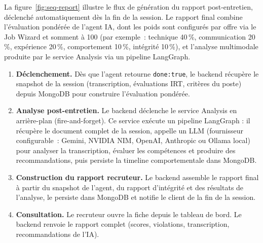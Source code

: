 La figure~\ref{fig:seq-report} illustre le flux de génération du rapport post-entretien,
déclenché automatiquement dès la fin de la session. Le rapport final combine l'évaluation
pondérée de l'agent IA, dont les poids sont configurés par offre via le Job Wizard et
somment à 100 (par exemple~: technique 40\,\%, communication 20\,\%, expérience 20\,\%,
comportement 10\,\%, intégrité 10\,\%), et l'analyse multimodale produite par le service
Analysis via un pipeline LangGraph.

\begin{sloppypar}
\begin{enumerate}
  \item \textbf{Déclenchement.} Dès que l'agent retourne \texttt{done:true}, le backend
        récupère le snapshot de la session (transcription, évaluations IRT, critères du
        poste) depuis MongoDB pour construire l'évaluation pondérée.

  \item \textbf{Analyse post-entretien.} Le backend déclenche le service Analysis en
        arrière-plan (fire-and-forget). Ce service exécute un pipeline LangGraph : il
        récupère le document complet de la session, appelle un LLM (fournisseur configurable~:
        Gemini, NVIDIA NIM, OpenAI, Anthropic ou Ollama local) pour analyser
        la transcription, évaluer les compétences et produire des recommandations, puis
        persiste la timeline comportementale dans MongoDB.

  \item \textbf{Construction du rapport recruteur.} Le backend assemble le rapport final
        à partir du snapshot de l'agent, du rapport d'intégrité et des résultats de
        l'analyse, le persiste dans MongoDB et notifie le client de la fin de la session.

  \item \textbf{Consultation.} Le recruteur ouvre la fiche depuis le tableau de bord. Le
        backend renvoie le rapport complet (scores, violations, transcription,
        recommandations de l'IA).
\end{enumerate}
\end{sloppypar}

